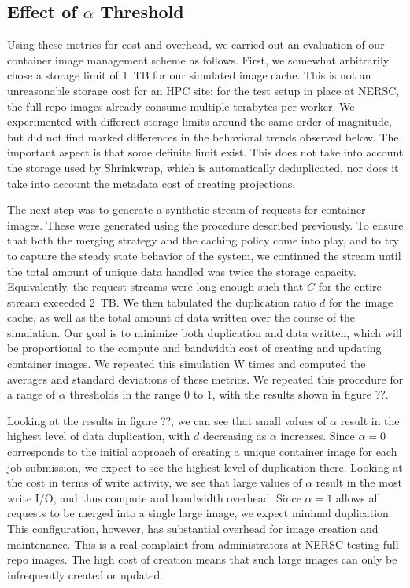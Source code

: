 \documentclass[sigconf]{acmart}
\begin{document}
\subsection{Effect of $\alpha$ Threshold}

Using these metrics for cost and overhead,
we carried out an evaluation of our container image management scheme as follows.
First, we somewhat arbitrarily chose a storage limit of 1~TB for our simulated image cache.
This is not an unreasonable storage cost for an HPC site;
for the test setup in place at NERSC,
the full repo images already consume multiple terabytes per worker.
We experimented with different storage limits around the same order of magnitude,
but did not find marked differences in the behavioral trends observed below.
The important aspect is that some definite limit exist.
This does not take into account the storage used by Shrinkwrap,
which is automatically deduplicated,
nor does it take into account the metadata cost of creating projections.

The next step was to generate a synthetic stream of requests for container images.
These were generated using the procedure described previously.
To ensure that both the merging strategy and the caching policy come into play,
and to try to capture the steady state behavior of the system,
we continued the stream until the total amount of unique data handled was twice the storage capacity.
Equivalently, the request streams were long enough such that $C$ for the entire stream exceeded 2~TB.
We then tabulated the duplication ratio $d$ for the image cache,
as well as the total amount of data written over the course of the simulation.
Our goal is to minimize both duplication and data written,
which will be proportional to the compute and bandwidth cost of creating and updating container images.
We repeated this simulation W times and computed the averages and standard deviations of these metrics.
We repeated this procedure for a range of $\alpha$ thresholds in the range 0 to 1,
with the results shown in figure ??.

Looking at the results in figure ??,
we can see that small values of $\alpha$ result in the highest level of data duplication,
with $d$ decreasing as $\alpha$ increases.
Since $\alpha=0$ corresponds to the initial approach of creating a unique container image for each job submission,
we expect to see the highest level of duplication there.
Looking at the cost in terms of write activity,
we see that large values of $\alpha$ result in the most write I/O,
and thus compute and bandwidth overhead.
Since $\alpha=1$ allows all requests to be merged into a single large image,
we expect minimal duplication.
This configuration, however,
has substantial overhead for image creation and maintenance.
This is a real complaint from administrators at NERSC testing full-repo images.
The high cost of creation means that such large images can only be infrequently created or updated.
\end{document}
